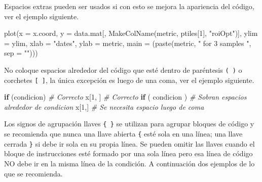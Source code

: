 \documentclass[
]{book}
\makeatletter
\newenvironment{Shaded}{\begin{snugshade}}{\end{snugshade}}
\newcommand{\AttributeTok}[1]{\textcolor[rgb]{0.77,0.63,0.00}{#1}}
\newcommand{\CommentTok}[1]{\textcolor[rgb]{0.56,0.35,0.01}{\textit{#1}}}
\newcommand{\ControlFlowTok}[1]{\textcolor[rgb]{0.13,0.29,0.53}{\textbf{#1}}}
\newcommand{\DecValTok}[1]{\textcolor[rgb]{0.00,0.00,0.81}{#1}}
\newcommand{\FunctionTok}[1]{\textcolor[rgb]{0.00,0.00,0.00}{#1}}
\newcommand{\NormalTok}[1]{#1}
\newcommand{\StringTok}[1]{\textcolor[rgb]{0.31,0.60,0.02}{#1}}
\newenvironment{kframe}{%
\medskip{}
\setlength{\fboxsep}{.8em}
 \def\at@end@of@kframe{}%
 \ifinner\ifhmode%
  \def\at@end@of@kframe{\end{minipage}}%
  \begin{minipage}{\columnwidth}%
 \fi\fi%
 \def\FrameCommand##1{\hskip\@totalleftmargin \hskip-\fboxsep
 \colorbox{shadecolor}{##1}\hskip-\fboxsep
     \hskip-\linewidth \hskip-\@totalleftmargin \hskip\columnwidth}%
 \MakeFramed {\advance\hsize-\width
   \@totalleftmargin\z@ \linewidth\hsize
   \@setminipage}}%
 {\par\unskip\endMakeFramed%
 \at@end@of@kframe}
\renewenvironment{Shaded}{\begin{kframe}}{\end{kframe}}
\makeatother
\begin{document}
Espacios extras pueden ser usados si con esto se mejora la apariencia del código, ver el ejemplo siguiente.

\begin{Shaded}
\begin{Highlighting}[]
\FunctionTok{plot}\NormalTok{(}\AttributeTok{x    =}\NormalTok{ x.coord,}
     \AttributeTok{y    =}\NormalTok{ data.mat[, }\FunctionTok{MakeColName}\NormalTok{(metric, ptiles[}\DecValTok{1}\NormalTok{], }\StringTok{"roiOpt"}\NormalTok{)],}
     \AttributeTok{ylim =}\NormalTok{ ylim,}
     \AttributeTok{xlab =} \StringTok{"dates"}\NormalTok{,}
     \AttributeTok{ylab =}\NormalTok{ metric,}
     \AttributeTok{main =}\NormalTok{ (}\FunctionTok{paste}\NormalTok{(metric, }\StringTok{" for 3 samples "}\NormalTok{, }\AttributeTok{sep =} \StringTok{""}\NormalTok{)))}
\end{Highlighting}
\end{Shaded}

No coloque espacios alrededor del código que esté dentro de paréntesis \texttt{(\ )} o corchetes \texttt{{[}\ {]}}, la única excepción es luego de una coma, ver el ejemplo siguiente.

\begin{Shaded}
\begin{Highlighting}[]
\ControlFlowTok{if}\NormalTok{ (condicion)    }\CommentTok{\# Correcto }
\NormalTok{x[}\DecValTok{1}\NormalTok{, ]            }\CommentTok{\# Correcto}
\ControlFlowTok{if}\NormalTok{ ( condicion )  }\CommentTok{\# Sobran espacios alrededor de condicion}
\NormalTok{x[}\DecValTok{1}\NormalTok{,]             }\CommentTok{\# Se necesita espacio luego de coma}
\end{Highlighting}
\end{Shaded}

Los signos de agrupación llaves \texttt{\{\ \}} se utilizan para agrupar bloques de código y se recomienda que nunca una llave abierta \texttt{\{} esté sola en una línea; una llave cerrada \texttt{\}} si debe ir sola en su propia línea. Se pueden omitir las llaves cuando el bloque de instrucciones esté formado por una sola línea pero esa línea de código NO debe ir en la misma línea de la condición. A continuación dos ejemplos de lo que se recomienda.
\end{document}
